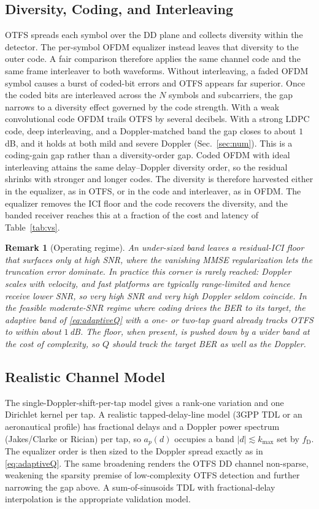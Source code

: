 \documentclass[onecolumn,journal]{IEEEtran}
\theoremstyle{bfhead}
\newtheorem{remark}{Remark}
\begin{document}
\subsection{Diversity, Coding, and Interleaving}
OTFS spreads each symbol over the DD plane and collects diversity within the
detector. The per-symbol OFDM equalizer instead leaves that diversity to the
outer code. A fair comparison therefore applies the same channel code and the
same frame interleaver to both waveforms. Without interleaving, a faded OFDM
symbol causes a burst of coded-bit errors and OTFS appears far superior. Once the
coded bits are interleaved across the $N$ symbols and subcarriers, the gap
narrows to a diversity effect governed by the code strength. With a weak
convolutional code OFDM trails OTFS by several decibels. With a strong LDPC code,
deep interleaving, and a Doppler-matched band the gap closes to about $1$\,dB,
and it holds at both mild and severe Doppler (Sec.~\ref{sec:num}). This is a coding-gain gap
rather than a diversity-order gap. Coded OFDM with ideal interleaving attains the
same delay--Doppler diversity order, so the residual shrinks with stronger and
longer codes. The diversity is therefore harvested either in the equalizer, as in
OTFS, or in the code and interleaver, as in OFDM. The equalizer removes the ICI
floor and the code recovers the diversity, and the banded receiver reaches this
at a fraction of the cost and latency of Table~\ref{tab:vs}.

\begin{remark}[Operating regime]
An under-sized band leaves a residual-ICI floor that surfaces only at high SNR,
where the vanishing MMSE regularization lets the truncation error dominate. In
practice this corner is rarely reached: Doppler scales with velocity, and fast
platforms are typically range-limited and hence receive lower SNR, so very high
SNR and very high Doppler seldom coincide. In the feasible moderate-SNR regime
where coding drives the BER to its target, the adaptive band of
\eqref{eq:adaptiveQ} with a one- or two-tap guard already tracks OTFS to within
about $1$\,dB. The floor, when present, is pushed down by a wider band at the
cost of complexity, so $Q$ should track the target BER as well as the Doppler.
\end{remark}

\subsection{Realistic Channel Model}
The single-Doppler-shift-per-tap model gives a rank-one variation and one
Dirichlet kernel per tap. A realistic tapped-delay-line model (3GPP TDL or an
aeronautical profile) has fractional delays and a Doppler power spectrum
(Jakes/Clarke or Rician) per tap, so $a_p(d)$ occupies a band
$|d|\lesssim k_{\max}$ set by $f_{\mathrm D}$. The equalizer order is then sized
to the Doppler spread exactly as in \eqref{eq:adaptiveQ}. The same
broadening renders the OTFS DD channel non-sparse, weakening the sparsity premise
of low-complexity OTFS detection and further narrowing the gap above. A
sum-of-sinusoids TDL with fractional-delay interpolation is the appropriate
validation model.
\end{document}

